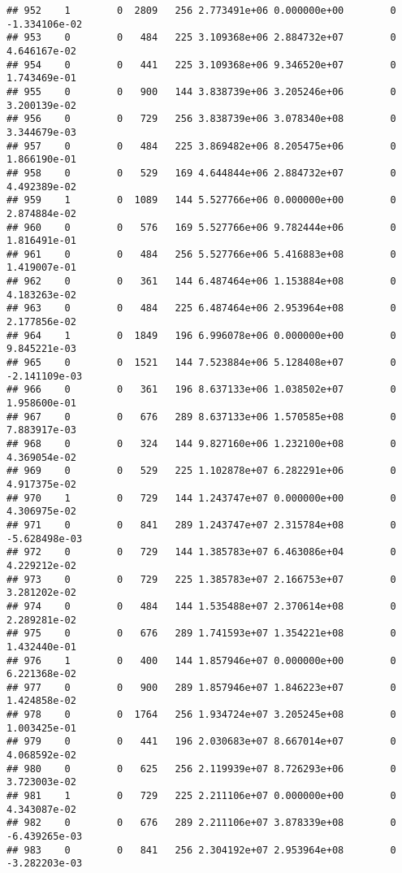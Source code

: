 \documentclass[
]{article}
\begin{document}
\begin{enumerate}
\begin{verbatim}
## 952    1        0  2809   256 2.773491e+06 0.000000e+00        0 -1.334106e-02
## 953    0        0   484   225 3.109368e+06 2.884732e+07        0  4.646167e-02
## 954    0        0   441   225 3.109368e+06 9.346520e+07        0  1.743469e-01
## 955    0        0   900   144 3.838739e+06 3.205246e+06        0  3.200139e-02
## 956    0        0   729   256 3.838739e+06 3.078340e+08        0  3.344679e-03
## 957    0        0   484   225 3.869482e+06 8.205475e+06        0  1.866190e-01
## 958    0        0   529   169 4.644844e+06 2.884732e+07        0  4.492389e-02
## 959    1        0  1089   144 5.527766e+06 0.000000e+00        0  2.874884e-02
## 960    0        0   576   169 5.527766e+06 9.782444e+06        0  1.816491e-01
## 961    0        0   484   256 5.527766e+06 5.416883e+08        0  1.419007e-01
## 962    0        0   361   144 6.487464e+06 1.153884e+08        0  4.183263e-02
## 963    0        0   484   225 6.487464e+06 2.953964e+08        0  2.177856e-02
## 964    1        0  1849   196 6.996078e+06 0.000000e+00        0  9.845221e-03
## 965    0        0  1521   144 7.523884e+06 5.128408e+07        0 -2.141109e-03
## 966    0        0   361   196 8.637133e+06 1.038502e+07        0  1.958600e-01
## 967    0        0   676   289 8.637133e+06 1.570585e+08        0  7.883917e-03
## 968    0        0   324   144 9.827160e+06 1.232100e+08        0  4.369054e-02
## 969    0        0   529   225 1.102878e+07 6.282291e+06        0  4.917375e-02
## 970    1        0   729   144 1.243747e+07 0.000000e+00        0  4.306975e-02
## 971    0        0   841   289 1.243747e+07 2.315784e+08        0 -5.628498e-03
## 972    0        0   729   144 1.385783e+07 6.463086e+04        0  4.229212e-02
## 973    0        0   729   225 1.385783e+07 2.166753e+07        0  3.281202e-02
## 974    0        0   484   144 1.535488e+07 2.370614e+08        0  2.289281e-02
## 975    0        0   676   289 1.741593e+07 1.354221e+08        0  1.432440e-01
## 976    1        0   400   144 1.857946e+07 0.000000e+00        0  6.221368e-02
## 977    0        0   900   289 1.857946e+07 1.846223e+07        0  1.424858e-02
## 978    0        0  1764   256 1.934724e+07 3.205245e+08        0  1.003425e-01
## 979    0        0   441   196 2.030683e+07 8.667014e+07        0  4.068592e-02
## 980    0        0   625   256 2.119939e+07 8.726293e+06        0  3.723003e-02
## 981    1        0   729   225 2.211106e+07 0.000000e+00        0  4.343087e-02
## 982    0        0   676   289 2.211106e+07 3.878339e+08        0 -6.439265e-03
## 983    0        0   841   256 2.304192e+07 2.953964e+08        0 -3.282203e-03

\end{verbatim}
\end{enumerate}
\end{document}
